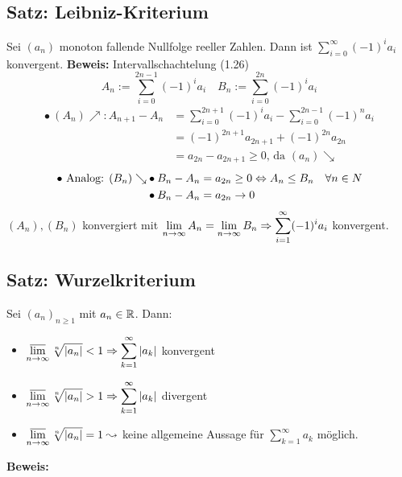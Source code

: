 \documentclass[10pt, a4paper, fleqn]{article}
\begin{document}
    \subsection{Satz: Leibniz-Kriterium}
    Sei $(a_n)$ monoton fallende Nullfolge reeller Zahlen. Dann ist
    $\sum_{i=0}^{\infty} (-1)^i a_i$ konvergent.
    \textbf{Beweis: }
    Intervallschachtelung (1.26)
    \[
        A_n := \sum_{i=0}^{2n-1} (-1)^i a_i \quad B_n := \sum_{i=0}^{2n} (-1)^i a_i
    \]
    \[\begin{aligned}   
        \bullet \ (A_n)\nearrow : A_{n+1} - A_n &= \sum_{i=0}^{2n+1} (-1)^i a_i -
        \sum_{i=0}^{2n-1} (-1)^n a_i \\
        &= (-1)^{2n+1} a_{2n+1} + (-1)^{2n} a_{2n} \\
        &= a_{2n} - a_{2n+1} \geq 0\text{, da } (a_n) \searrow 
    \end{aligned}\]
    \[\begin{aligned}
        \bullet\text{ Analog: } (B_n)\searrow  
            &\bullet B_n - A_n = a_{2n} \geq 0 \Leftrightarrow A_n \leq B_n \quad \forall n \in N \\
            &\bullet B_n - A_n = a_{2n} \to 0
    \end{aligned}\]
    $(A_n), (B_n)$ konvergiert mit $\displaystyle \lim_{n \to \infty} A_n = 
    \lim_{n \to \infty} B_n \Rightarrow \sum_{i=1}^\infty (-1)^i a_i$ konvergent.

    \subsection{Satz: Wurzelkriterium}
    Sei $(a_n)_{n \geq 1}$ mit $a_n \in \mathbb{R}$. Dann:
    \begin{itemize}
        \item $\displaystyle \varlimsup_{n \to \infty} \sqrt[n]{|a_n|} < 1 \Rightarrow \sum_{k=1}^\infty |a_k|$ konvergent
        \item $\displaystyle \varlimsup_{n \to \infty} \sqrt[n]{|a_n|} > 1 \Rightarrow \sum_{k=1}^\infty |a_k|$ divergent
        \item $\displaystyle \varlimsup_{n \to \infty} \sqrt[n]{|a_n|} = 1 \leadsto $ keine allgemeine Aussage für
        $\sum_{k=1}^\infty a_k$ möglich.
    \end{itemize}

    \textbf{Beweis: }
\end{document}
